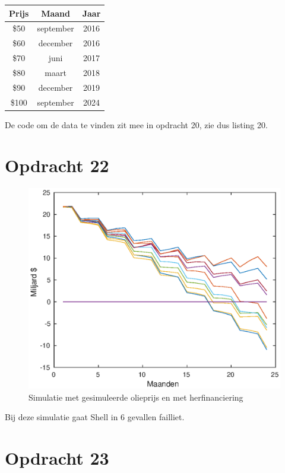 \documentclass[11pt,a4paper]{article}
\begin{document}
\begin{table}[H]
\centering
\begin{tabular}{c|c|c}
Prijs & Maand & Jaar\\
\hline
\$50 & september & 2016\\
\$60 & december & 2016\\
\$70 & juni & 2017\\
\$80 & maart & 2018\\
\$90 & december & 2019\\
\$100 & september & 2024\\
\end{tabular}
\end{table}
De code om de data te vinden zit mee in opdracht 20, zie dus listing 20.
\section*{Opdracht 22}

\begin{figure}[H]
\centering
\includegraphics[scale=0.75]{opdracht22}
\caption{Simulatie met gesimuleerde olieprijs en met herfinanciering}
\end{figure}
Bij deze simulatie gaat Shell in 6 gevallen failliet.



\section*{Opdracht 23}
\end{document}
